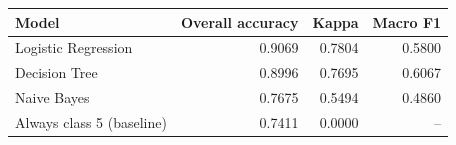 \begin{tabular}{lrrr}
\toprule
Model & Overall accuracy & Kappa & Macro F1 \\
\midrule
Logistic Regression & 0.9069 & 0.7804 & 0.5800 \\
Decision Tree & 0.8996 & 0.7695 & 0.6067 \\
Naive Bayes & 0.7675 & 0.5494 & 0.4860 \\
\midrule
Always class 5 (baseline) & 0.7411 & 0.0000 & -- \\
\bottomrule
\end{tabular}
